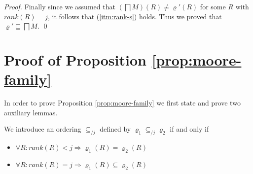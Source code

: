 \begin{proof}
  \noindent Finally since we assumed that $(\bigsqcap
  M)(R)\neq\varrho'(R)$ for some $R$ with $rank(R)=j$, it follows that
  (\ref{itm:rank-s}) holds. Thus we proved that $\varrho' \sqsubseteq
  \bigsqcap M$.
  \qed

\end{proof}

\section{Proof of Proposition \ref{prop:moore-family}}\label{proof:prop:moore-family}

In order to prove Proposition \ref{prop:moore-family} we first state
and prove two auxiliary lemmas.

\begin{definition}\label{def:order-j}
\noindent We introduce  an ordering $\subseteq_{/j}$ defined by $\varrho_1
\subseteq_{/j} \varrho_2$ if and only if
\begin{itemize}
\item $\forall R: rank(R) < j \Rightarrow \varrho_1(R) = \varrho_2(R)$
\item $\forall R: rank(R) = j \Rightarrow \varrho_1(R) \subseteq
  \varrho_2(R)$
\end{itemize}
\end{definition}

